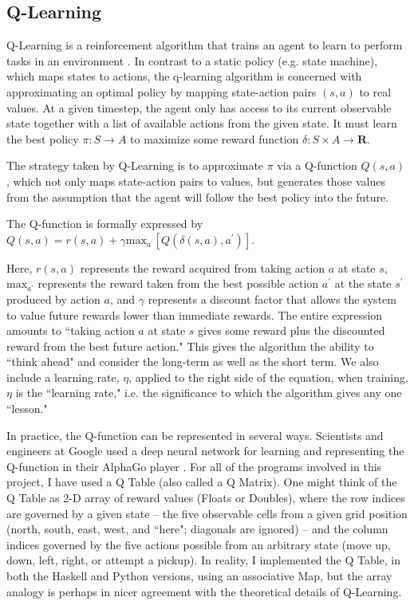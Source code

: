 \documentclass[12pt,a4paper]{article}
\begin{document}
		\subsection{Q-Learning}\label{beefcake}
		
		\par Q-Learning is a reinforcement algorithm that trains an agent to learn to perform tasks in an environment \cite{RL}. In contrast to a static policy (e.g. state machine), which maps states to actions, the q-learning algorithm is concerned with approximating an optimal policy by mapping state-action pairs $(s, a)$ to real values. At a given timestep, the agent only has access to its current observable state together with a list of available actions from the given state. It must learn the best policy $\pi : S \rightarrow A$ to maximize some reward function $\delta : S \times A \rightarrow \mathbf{R}$.
		\par The strategy taken by Q-Learning is to approximate $\pi$ via a Q-function $Q(s,a)$, which not only maps state-action pairs to values, but generates those values from the assumption that the agent will follow the best policy into the future.
		\par The Q-function is formally expressed by $Q(s,a) = r(s,a) + \gamma \text{max}_{a^\prime} [Q(\delta(s,a), a^\prime)]$.
		\par Here, $r(s,a)$ represents the reward acquired from taking action $a$ at state $s$, $\text{max}_{a^\prime}$ represents the reward taken from the best possible action $a^\prime$ at the state $s^\prime$ produced by action $a$, and $\gamma$ represents a discount factor that allows the system to value future rewards lower than immediate rewards. The entire expression amounts to ``taking action $a$ at state $s$ gives some reward plus the discounted reward from the best future action." This gives the algorithm the ability to ``think ahead" and consider the long-term as well as the short term. We also include a learning rate, $\eta$, applied to the right side of the equation, when training. $\eta$ is the ``learning rate," i.e. the significance to which the algorithm gives any one ``lesson."
		\par In practice, the Q-function can be represented in several ways. Scientists and engineers at Google used a deep neural network for learning and representing the Q-function in their AlphaGo player \cite{alphago}. For all of the programs involved in this project, I have used a Q Table (also called a Q Matrix). One might think of the Q Table as 2-D array of reward values (Floats or Doubles), where the row indices are governed by a given state -- the five observable cells from a given grid position (north, south, east, west, and ``here"; diagonals are ignored) -- and the column indices governed by the five actions possible from an arbitrary state (move up, down, left, right, or attempt a pickup). In reality, I implemented the Q Table, in both the Haskell and Python versions, using an associative Map, but the array analogy is perhaps in nicer agreement with the theoretical details of Q-Learning.
\end{document}
